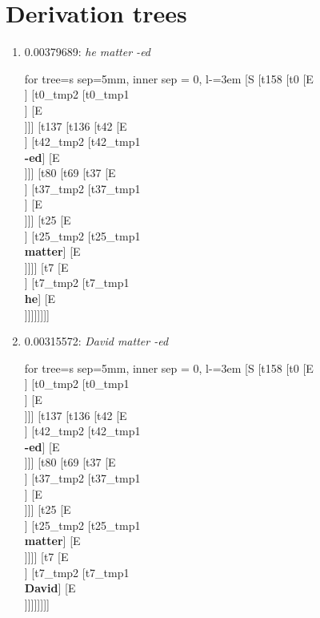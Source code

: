 \documentclass[11pt]{article}
\begin{document}
\section{Derivation trees}
\begin{enumerate}
	\item  0.00379689: \textit{he matter -ed} \\[0.5em]
	\begin{forest}
	for tree={s sep=5mm, inner sep = 0, l-=3em}
	[S [t158 [t0 [E\\ ] [t0_tmp2 [t0_tmp1\\ ] [E\\ ]]] [t137 [t136 [t42 [E\\ ] [t42_tmp2 [t42_tmp1\\\textbf{-ed}] [E\\ ]]] [t80 [t69 [t37 [E\\ ] [t37_tmp2 [t37_tmp1\\ ] [E\\ ]]] [t25 [E\\ ] [t25_tmp2 [t25_tmp1\\\textbf{matter}] [E\\ ]]]] [t7 [E\\ ] [t7_tmp2 [t7_tmp1\\\textbf{he}] [E\\ ]]]]]]]]
	\end{forest}
	\newpage

	\item  0.00315572: \textit{David matter -ed} \\[0.5em]
	\begin{forest}
	for tree={s sep=5mm, inner sep = 0, l-=3em}
	[S [t158 [t0 [E\\ ] [t0_tmp2 [t0_tmp1\\ ] [E\\ ]]] [t137 [t136 [t42 [E\\ ] [t42_tmp2 [t42_tmp1\\\textbf{-ed}] [E\\ ]]] [t80 [t69 [t37 [E\\ ] [t37_tmp2 [t37_tmp1\\ ] [E\\ ]]] [t25 [E\\ ] [t25_tmp2 [t25_tmp1\\\textbf{matter}] [E\\ ]]]] [t7 [E\\ ] [t7_tmp2 [t7_tmp1\\\textbf{David}] [E\\ ]]]]]]]]
	\end{forest}
	\newpage


\end{enumerate}
\end{document}
